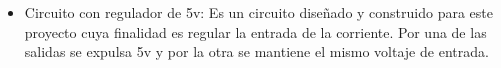 \begin{itemize}
\item Circuito con regulador de 5v: Es un circuito diseñado y construido para este proyecto cuya finalidad es regular la 
entrada de la corriente. Por una de las salidas se expulsa 5v y por la otra se mantiene el mismo voltaje de entrada. 
\end{itemize}




